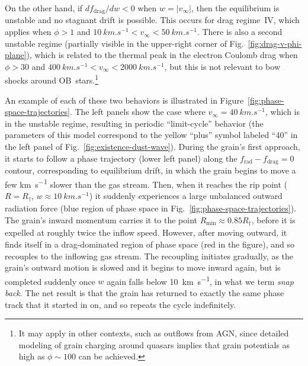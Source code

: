 \message{ !name(dusty-bow-wave.tex)}\documentclass[useAMS, usenatbib, a4paper]{mnras}
\providecommand{\abs}[1]{\lvert#1\rvert}
\newcommand\drag{\ensuremath{_{\text{drag}}}}
\newcommand\rad{\ensuremath{_{\text{rad}}}}
\newcommand\Rmin{\ensuremath{R_{\scriptscriptstyle\text{min}}}}
\begin{document}
On the other hand, if \(d f\drag / d w < 0\) when
\(w = \abs{v_\infty}\), then the equilibrium is unstable and no stagnant
drift is possible.  This occurs for drag regime~IV, which applies when
\(\phi > 1\) and
\(\SI{10}{km.s^{-1}} < v_\infty < \SI{50}{km.s^{-1}}\).  There is also a
second unstable regime (partially visible in the upper-right corner of
Fig.~\ref{fig:drag-v-phi-plane}), which is related to the thermal peak
in the electron Coulomb drag when \(\phi > 30\) and
\(\SI{400}{km.s^{-1}} < v_\infty < \SI{2000}{km.s^{-1}}\), but this is not
relevant to bow shocks around OB~stars.\footnote{%
  It may apply in other contexts, such as outflows from AGN, since
  detailed modeling of grain charging around quasars
  \citep{Weingartner:2006a} implies that grain potentials as high as
  \(\phi \sim 100\) can be achieved.} %

An example of each of these two behaviors is illustrated in
Figure~\ref{fig:phase-space-trajectories}.  The left panels show the
case where \(v_\infty = \SI{40}{km.s^{-1}}\), which is in the unstable
regime, resulting in periodic ``limit-cycle'' behavior (the parameters
of this model correspond to the yellow ``plus'' symbol labeled ``40''
in the left panel of Fig.~\ref{fig:existence-dust-wave}).  During the
grain's first approach, it starts to follow a phase trajectory (lower
left panel) along the \(f\rad - f\drag = 0\) contour, corresponding to
equilibrium drift, in which the grain begins to move a few
\si{km.s^{-1}} slower than the gas stream.  Then, when it reaches the
rip point (\(R = R_\dag\), \(w \approx \SI{10}{km.s^{-1}}\)) it suddenly
experiences a large unbalanced outward radiation force (blue region of
phase space in Fig.~\ref{fig:phase-space-trajectories}). The grain's
inward momentum carries it to the point \(\Rmin \approx 0.85 R_\dag\), before
it is expelled at roughly twice the inflow speed.  However, after
moving outward, it finds itself in a drag-dominated region of phase
space (red in the figure), and so recouples to the inflowing gas
stream.  The recoupling initiates gradually, as the grain's outward
motion is slowed and it begins to move inward again, but is completed
suddenly once \(w\) again falls below \SI{10}{km.s^{-1}}, in what we
term \textit{snap back}. The net result is that the grain has returned
to exactly the same phase track that it started in on, and so repeats
the cycle indefinitely.
\end{document}
